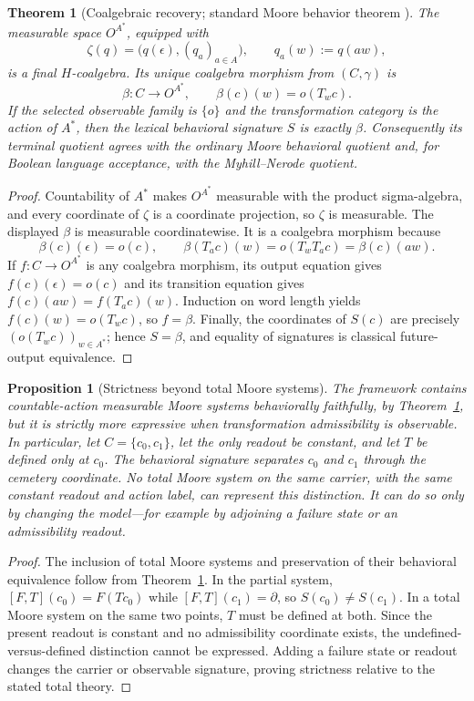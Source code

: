 \documentclass[11pt]{article}
\newtheorem{theorem}[definition]{Theorem}
\newtheorem{proposition}[definition]{Proposition}
\begin{document}
{\begin{theorem}[Coalgebraic recovery; standard Moore behavior theorem \cite{loregian2025,rutten2000}]\label{thm:coalgebra-recovery}
The measurable space $O^{A^*}$, equipped with
\[
\zeta(q)=\bigl(q(\epsilon),(q_a)_{a\in A}\bigr),
\qquad q_a(w):=q(aw),
\]
is a final $H$-coalgebra. Its unique coalgebra morphism from $(C,\gamma)$ is
\[
\beta:C\longrightarrow O^{A^*},
\qquad
\beta(c)(w)=o(T_w c).
\]
If the selected observable family is $\{o\}$ and the transformation category is the action of $A^*$, then the lexical behavioral signature $S$ is exactly $\beta$. Consequently its terminal quotient agrees with the ordinary Moore behavioral quotient and, for Boolean language acceptance, with the Myhill--Nerode quotient.
\end{theorem}

\begin{proof}
Countability of $A^*$ makes $O^{A^*}$ measurable with the product sigma-algebra, and every coordinate of $\zeta$ is a coordinate projection, so $\zeta$ is measurable. The displayed $\beta$ is measurable coordinatewise. It is a coalgebra morphism because
\[
\beta(c)(\epsilon)=o(c),
\qquad
\beta(T_a c)(w)=o(T_wT_a c)=\beta(c)(aw).
\]
If $f:C\to O^{A^*}$ is any coalgebra morphism, its output equation gives $f(c)(\epsilon)=o(c)$ and its transition equation gives $f(c)(aw)=f(T_a c)(w)$. Induction on word length yields $f(c)(w)=o(T_w c)$, so $f=\beta$. Finally, the coordinates of $S(c)$ are precisely $(o(T_w c))_{w\in A^*}$; hence $S=\beta$, and equality of signatures is classical future-output equivalence.
\end{proof}

\begin{proposition}[Strictness beyond total Moore systems]\label{prop:strict-extension}
The framework contains countable-action measurable Moore systems behaviorally faithfully, by Theorem~\ref{thm:coalgebra-recovery}, but it is strictly more expressive when transformation admissibility is observable. In particular, let $C=\{c_0,c_1\}$, let the only readout be constant, and let $T$ be defined only at $c_0$. The behavioral signature separates $c_0$ and $c_1$ through the cemetery coordinate. No total Moore system on the same carrier, with the same constant readout and action label, can represent this distinction. It can do so only by changing the model---for example by adjoining a failure state or an admissibility readout.
\end{proposition}

\begin{proof}
The inclusion of total Moore systems and preservation of their behavioral equivalence follow from Theorem~\ref{thm:coalgebra-recovery}. In the partial system, $[F,T](c_0)=F(Tc_0)$ while $[F,T](c_1)=\partial$, so $S(c_0)\ne S(c_1)$. In a total Moore system on the same two points, $T$ must be defined at both. Since the present readout is constant and no admissibility coordinate exists, the undefined-versus-defined distinction cannot be expressed. Adding a failure state or readout changes the carrier or observable signature, proving strictness relative to the stated total theory.
\end{proof}

}
\end{document}
